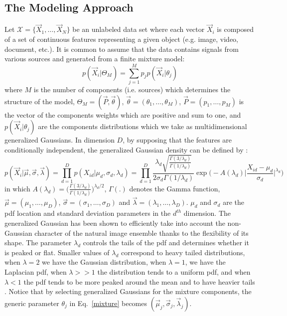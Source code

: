 \documentclass[journal,10pt]{elsart}
\begin{document}
\subsection{The Modeling Approach}\label{approach}
Let $\mathcal {X}=\{\vec{X}_1,\ldots,\vec{X}_N\}$ be an unlabeled data set where each vector $\vec{X}_i$ is composed of a set of continuous features representing a given object (e.g. image, video, document, etc.). It is common to assume that the data contains signals from various sources and generated from a finite mixture model:
\begin{equation}\label{mixture}
p(\vec{X}_i|\Theta_M)=\sum_{j=1}^M p_j p(\vec{X}_i|\theta_j)
\end{equation}
where $M$ is the number of components (i.e. sources) which determines the structure of the model, $\Theta_M=(\vec{P},\vec{\theta})$, $\vec{\theta}=(\theta_1,\ldots,\theta_M)$, $\vec{P}=(p_1,\ldots,p_M)$  is the vector of the components weights which are positive and sum to one, and $p(\vec{X}_i|\theta_j)$ are the components distributions which we take as multidimensional generalized Gaussians. In dimension $D$, by supposing that the features are conditionally independent, the generalized Gaussian density can be defined by \cite{Zhang1990}:
\begin{equation}  \label{i1}
p(\vec{X}_i|\vec{\mu},\vec{\sigma},\vec{\lambda})=\prod_{d=1}^{D}p(X_{id}|\mu_d,\sigma_d,\lambda_d)=\prod_{d=1}^{D}\frac{\lambda_d
\sqrt{\frac{\Gamma(3/\lambda_d)}{\Gamma(1/\lambda_d)}}}{2\sigma_d\Gamma(1/\lambda_d)}\exp\bigg(-A(\lambda_d)\bigg|\frac{X_{id}-\mu_d}{\sigma_d}\bigg|^{\lambda_d}\bigg)
\end{equation}
in which
$A(\lambda_d)=\bigg(\frac{\Gamma(3/\lambda_d)}{\Gamma(1/\lambda_d)}\bigg)^{\lambda_d/2}$,
$\Gamma(.)$ denotes the Gamma function,
$\vec{\mu}=(\mu_1,\ldots,\mu_D)$,
$\vec{\sigma}=(\sigma_1,\ldots,\sigma_D)$ and $\vec{\lambda}=(\lambda_1,\ldots,\lambda_D)$. $\mu_{d}$ and
$\sigma_{d}$ are the pdf location and standard deviation parameters
in the $d^{th}$ dimension. The generalized Gaussian has been shown to efficiently take into account the non-Gaussian character of the natural image ensemble \cite{Ruderman1994} thanks to the flexibility of its shape. The parameter $\lambda_{d}$
controls the tails of the pdf and determines whether it is peaked
or flat. Smaller values of
$\lambda_{d}$ correspond to heavy tailed distributions, when $\lambda=2$ we have the Gaussian distribution, when $\lambda=1$, we have the Laplacian pdf, when $\lambda>>1$ the distribution tends to a uniform pdf, and when $\lambda<1$ the pdf tends to be more peaked around the mean and to have heavier tails \cite{Zhang1990}. Notice that by selecting generalized Gaussians for the mixture components, the generic parameter $\theta_{j}$ in Eq.~\ref{mixture} becomes $(\vec{\mu}_j,\vec{\sigma}_j,\vec{\lambda}_j)$.\\
\end{document}
